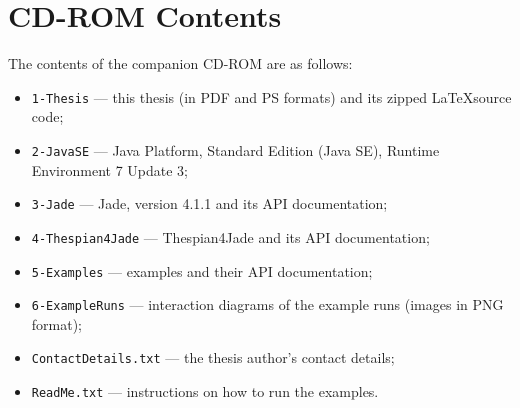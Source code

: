 
\chapter{CD-ROM Contents}

The contents of the companion CD-ROM are as follows:
\begin{itemize} %
	\item \texttt{1-Thesis} --- this thesis (in PDF and PS formats) and its zipped \LaTeX source code;
	\item \texttt{2-JavaSE} --- Java Platform, Standard Edition (Java SE), Runtime Environment 7 Update 3;
	\item \texttt{3-Jade} --- Jade, version 4.1.1 and its API documentation;
	\item \texttt{4-Thespian4Jade} --- Thespian4Jade and its API documentation;
	\item \texttt{5-Examples} --- examples and their API documentation;
	\item \texttt{6-ExampleRuns} --- interaction diagrams of the example runs (images in PNG format);
	\item \texttt{ContactDetails.txt} --- the thesis author's contact details;
	\item \texttt{ReadMe.txt} --- instructions on how to run the examples.
\end{itemize}